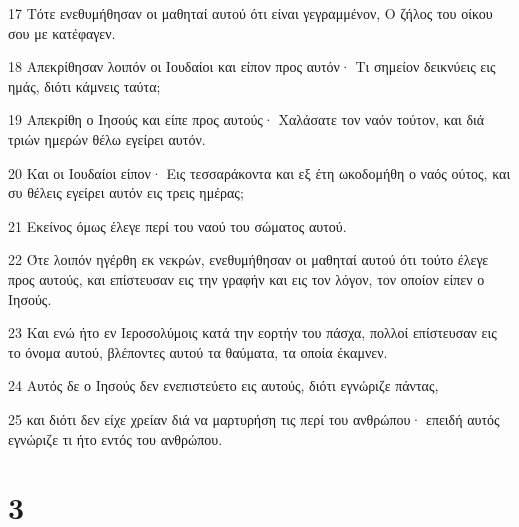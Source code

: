 \par 17 Τότε ενεθυμήθησαν οι μαθηταί αυτού ότι είναι γεγραμμένον, Ο ζήλος του οίκου σου με κατέφαγεν.
\par 18 Απεκρίθησαν λοιπόν οι Ιουδαίοι και είπον προς αυτόν· Τι σημείον δεικνύεις εις ημάς, διότι κάμνεις ταύτα;
\par 19 Απεκρίθη ο Ιησούς και είπε προς αυτούς· Χαλάσατε τον ναόν τούτον, και διά τριών ημερών θέλω εγείρει αυτόν.
\par 20 Και οι Ιουδαίοι είπον· Εις τεσσαράκοντα και εξ έτη ωκοδομήθη ο ναός ούτος, και συ θέλεις εγείρει αυτόν εις τρεις ημέρας;
\par 21 Εκείνος όμως έλεγε περί του ναού του σώματος αυτού.
\par 22 Ότε λοιπόν ηγέρθη εκ νεκρών, ενεθυμήθησαν οι μαθηταί αυτού ότι τούτο έλεγε προς αυτούς, και επίστευσαν εις την γραφήν και εις τον λόγον, τον οποίον είπεν ο Ιησούς.
\par 23 Και ενώ ήτο εν Ιεροσολύμοις κατά την εορτήν του πάσχα, πολλοί επίστευσαν εις το όνομα αυτού, βλέποντες αυτού τα θαύματα, τα οποία έκαμνεν.
\par 24 Αυτός δε ο Ιησούς δεν ενεπιστεύετο εις αυτούς, διότι εγνώριζε πάντας,
\par 25 και διότι δεν είχε χρείαν διά να μαρτυρήση τις περί του ανθρώπου· επειδή αυτός εγνώριζε τι ήτο εντός του ανθρώπου.

\chapter{3}

